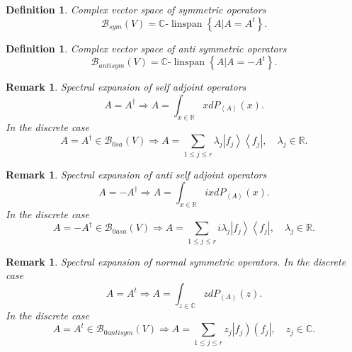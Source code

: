 \documentclass[aps,preprint]{revtex4}%
\newtheorem{definition}[theorem]{Definition}
\newtheorem{remark}[theorem]{Remark}
\begin{document}
\begin{definition}
Complex vector space of symmetric operators
\begin{equation}
\mathcal{B}_{sym}\left(  V\right)  =\mathbb{C}\text{-}\operatorname*{linspan}%
\left\{  \left.  A\right\vert A=A^{t}\right\}  .
\end{equation}

\end{definition}

\begin{definition}
Complex vector space of anti symmetric operators
\begin{equation}
\mathcal{B}_{antisym}\left(  V\right)  =\mathbb{C}\text{-}%
\operatorname*{linspan}\left\{  \left.  A\right\vert A=-A^{t}\right\}  .
\end{equation}

\end{definition}

\begin{remark}
Spectral expansion of self adjoint operators
\begin{equation}
A=A^{\dagger}\Rightarrow A=\int_{x\in\mathbb{R}}xdP_{\left\langle
A\right\rangle }\left(  x\right)  .
\end{equation}
In the discrete case
\begin{equation}
A=A^{\dagger}\in\mathcal{B}_{0sa}\left(  V\right)  \Rightarrow A=\sum_{1\leq
j\leq r}\lambda_{j}\left\vert f_{j}\right\rangle \left\langle f_{j}\right\vert
,\quad\lambda_{j}\in\mathbb{R}.
\end{equation}

\end{remark}

\begin{remark}
Spectral expansion of anti self adjoint operators
\begin{equation}
A=-A^{\dagger}\Rightarrow A=\int_{x\in\mathbb{R}}ixdP_{\left\langle
A\right\rangle }\left(  x\right)  .
\end{equation}
In the discrete case
\begin{equation}
A=-A^{\dagger}\in\mathcal{B}_{0asa}\left(  V\right)  \Rightarrow A=\sum_{1\leq
j\leq r}i\lambda_{j}\left\vert f_{j}\right\rangle \left\langle f_{j}%
\right\vert ,\quad\lambda_{j}\in\mathbb{R}.
\end{equation}

\end{remark}

\begin{remark}
Spectral expansion of normal symmetric operators. In the discrete case
\begin{equation}
A=A^{t}\Rightarrow A=\int_{z\in\mathbb{C}}zdP_{\left(  A\right)  }\left(
z\right)  .
\end{equation}
In the discrete case%
\begin{equation}
A=A^{t}\in\mathcal{B}_{0antisym}\left(  V\right)  \Rightarrow A=\sum_{1\leq
j\leq r}z_{j}\left\vert f_{j}\right)  \left(  f_{j}\right\vert ,\quad z_{j}%
\in\mathbb{C}.
\end{equation}

\end{remark}
\end{document}
